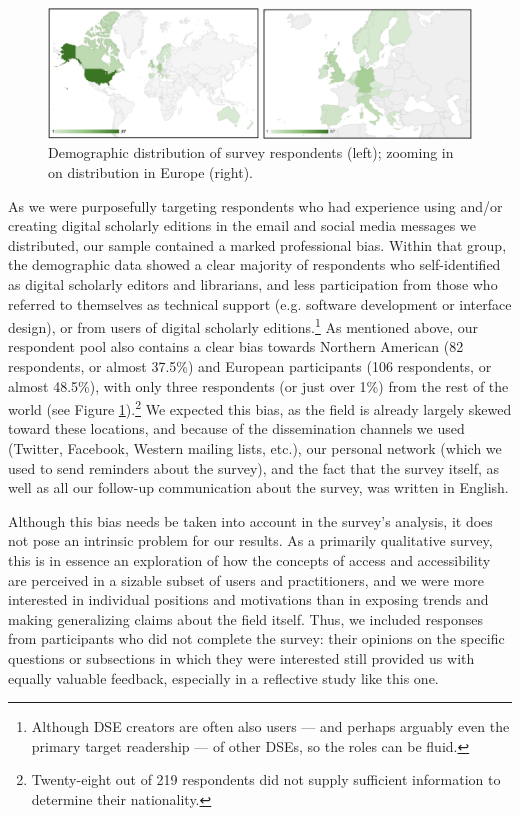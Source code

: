 \begin{paper}
\begin{figure}[H]
\includegraphics[width=\textwidth]{media/martinez1.png}
\caption[Demographic distribution of survey respondents (left); zooming in on distribution in Europe (right).]{Demographic distribution of survey respondents (left); zooming in on distribution in Europe (right).}
\label{demographic}
\end{figure}

As we were purposefully targeting respondents who had experience using
and/or creating digital scholarly editions in the email and social media
messages we distributed, our sample contained a marked professional
bias. Within that group, the demographic data showed a clear majority of
respondents who self-identified as digital scholarly editors and
librarians, and less participation from those who referred to themselves
as technical support (e.g. software \mbox{development} or interface design), or
from users of digital scholarly editions.\footnote{Although DSE creators
  are often also users --- and perhaps arguably even the primary target
  readership --- of other DSEs, so the roles can be fluid.} As mentioned
above, our respondent pool also contains a clear bias towards Northern
American (82 respondents, or almost 37.5\%) and European participants (106 respondents, or almost 48.5\%), with only three respondents (or just over 1\%) from the rest of the world (see Figure \ref{demographic}).\footnote{Twenty-eight out of 219 respondents did not supply sufficient information to determine their nationality.} We expected this bias, as
the field is already largely skewed toward these locations, and because
of the dissemination channels we used (Twitter, Facebook, Western
mailing lists, etc.), our personal network (which we used to send
reminders about the survey), and the fact that the survey itself, as
well as all our follow-up communication about the survey, was written in
English.

Although this bias needs be taken into account in the survey's analysis,
it does not pose an intrinsic problem for our results. As a primarily
qualitative survey, this is in essence an exploration of how the
concepts of access and accessibility are perceived in a sizable subset
of users and practitioners, and we were more interested in individual
positions and motivations than in exposing trends and making
generalizing claims about the field itself. Thus, we included responses
from participants who did not complete the survey: their opinions on the
specific questions or subsections in which they were interested still
provided us with equally valuable feedback, especially in a reflective
study like this one.


\end{paper}
